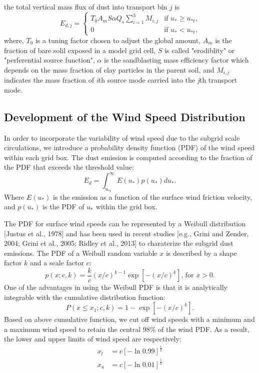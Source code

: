   the total
   vertical mass flux of dust into transport bin $j$ is
   \begin{equation} \label{eq:Ed}
   E_{d,j} = 
     \begin{cases} T_0 A_m S \alpha Q_s
                   \displaystyle \sum_{i=1}^3 M_{i,j} & \mbox{if $u_* \geq u_{*t}$,} \\
                   0 & \mbox{if $u_* < u_{*t}$,}
     \end{cases}
   \end{equation}
   where, $T_0$ is a tuning factor chosen to adjust the global amount, $A_m$ is the fraction
   of bare solil exposed in a model grid cell, $S$ is called "erodiblity" or "perferential 
   source function", $\alpha$ is the sandblasting mass efficiency factor which depends on the
   mass fraction of clay particles in the parent soil, and $M_{i,j}$ indicates the mass 
   fraction of \textit{i}th source mode carried into the \textit{j}th transport mode.

\subsection{Development of the Wind Speed Distribution}

  In order to incorporate the variability of wind speed due to the subgrid scale
  circulations, we introduce a probability density function (PDF) of the wind speed
  within each grid box. The dust emission is computed according to the fraction of 
  the PDF that exceeds the threshold value:
  \begin{equation}
  E_{d} = \int^\infty_{u_{*t}} E(u_*) p(u_*) d u_* \mbox{.}
  \end{equation}
  Where $E(u_*)$ is the emission as a function of the surface wind friction velocity,
  and $p(u_*)$ is the PDF of $u_*$ within the grid box. 

  The PDF for surface wind speeds can be represented by a Weibull distribution 
  [Justus et al., 1978] and has been used in recent studies [e.g., Grini and Zender,
  2004; Grini et al., 2005; Ridley et al., 2013] to charaterize the subgrid dust 
  emissions. The PDF of a Weibull random variable $x$ is described by a shape factor $k$ 
  and a scale factor $c$:
  \begin{equation}
  p(x;c,k) = \frac{k}{c} (x/c )^{k-1}
         \exp{\left[ -(x/c)^k \right]} \mbox{,  for } x>0 \mbox{.} 
  \end{equation}
  One of the advantages in using the Weibull PDF is that it is analytically 
  integrable with the cumulative distribution function:
  \begin{equation}
  P(x \leq x_1;c,k) = 1 - \exp{ \left[ -(x/c)^k\right] } \mbox{.}
  \end{equation} 
  Based on above cumulative function, we cut off wind speeds with a minimum and a 
  maximum wind speed to retain the central 98\% of the wind PDF. As a result, the 
  lower and upper limits of wind speed are respectively:
  \begin{align} 
  x_{l} &= c \left[ -\ln{0.99} \right]^{\frac{1}{k}}  \\
  x_{u} &= c \left[ -\ln{0.01} \right]^{\frac{1}{k}} \label{eq:xu}
  \end{align}

